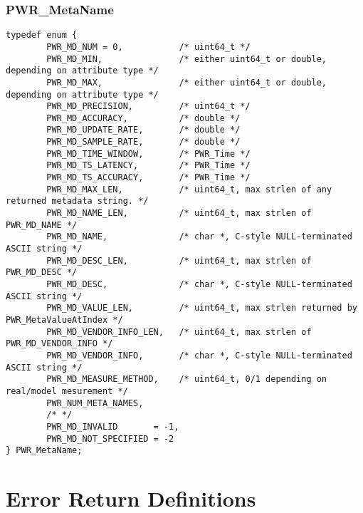 \subsubsection{PWR_MetaName}\label{type:MetaName}
\begin{center}
\begin{minipage}{.95\linewidth}%
\begin{lstlisting}
typedef enum {
        PWR_MD_NUM = 0,           /* uint64_t */
        PWR_MD_MIN,               /* either uint64_t or double, depending on attribute type */
        PWR_MD_MAX,               /* either uint64_t or double, depending on attribute type */
        PWR_MD_PRECISION,         /* uint64_t */
        PWR_MD_ACCURACY,          /* double */
        PWR_MD_UPDATE_RATE,       /* double */
        PWR_MD_SAMPLE_RATE,       /* double */
        PWR_MD_TIME_WINDOW,       /* PWR_Time */
        PWR_MD_TS_LATENCY,        /* PWR_Time */
        PWR_MD_TS_ACCURACY,       /* PWR_Time */
        PWR_MD_MAX_LEN,           /* uint64_t, max strlen of any returned metadata string. */
        PWR_MD_NAME_LEN,          /* uint64_t, max strlen of PWR_MD_NAME */
        PWR_MD_NAME,              /* char *, C-style NULL-terminated ASCII string */
        PWR_MD_DESC_LEN,          /* uint64_t, max strlen of PWR_MD_DESC */
        PWR_MD_DESC,              /* char *, C-style NULL-terminated ASCII string */
        PWR_MD_VALUE_LEN,         /* uint64_t, max strlen returned by PWR_MetaValueAtIndex */
        PWR_MD_VENDOR_INFO_LEN,   /* uint64_t, max strlen of PWR_MD_VENDOR_INFO */
        PWR_MD_VENDOR_INFO,       /* char *, C-style NULL-terminated ASCII string */
        PWR_MD_MEASURE_METHOD,    /* uint64_t, 0/1 depending on real/model mesurement */
        PWR_NUM_META_NAMES,
        /* */
        PWR_MD_INVALID       = -1,
        PWR_MD_NOT_SPECIFIED = -2
} PWR_MetaName;
\end{lstlisting}
\end{minipage}
\end{center}



\section{Error Return Definitions}\label{sec:ErrorReturnDefinitions}

